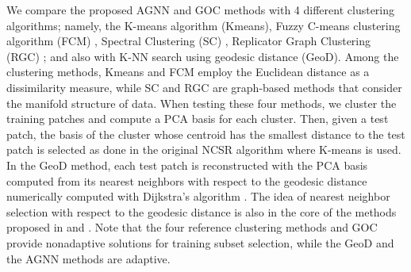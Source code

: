 \documentclass[journal]{IEEEtran}
\begin{document}
We compare the proposed AGNN and GOC methods  with 4 different clustering algorithms; namely,  the K-means algorithm (Kmeans), Fuzzy C-means clustering algorithm (FCM) \cite{Bezdek1984}, Spectral Clustering (SC) \cite{Shi00normalized}, Replicator Graph Clustering (RGC) \cite{Donoser13replicator}; and also with K-NN search using geodesic distance (GeoD). Among the clustering methods,  Kmeans and FCM employ the Euclidean distance as a dissimilarity measure, while SC and RGC are graph-based methods that consider the manifold structure of data. When testing these four methods, we cluster the training patches and compute a PCA basis for each cluster. Then, given a test patch, the basis of the cluster whose centroid has the smallest distance to the test patch is selected as done in the original NCSR algorithm where K-means is used. In the GeoD method, each test patch is reconstructed with the PCA basis computed from its nearest neighbors with respect to the geodesic distance numerically computed with Dijkstra's algorithm \cite{Dijkstra59a}. The idea of nearest neighbor selection with respect to the geodesic distance is also in the core of the methods proposed in \cite{Turaga10nearest} and \cite{Chaudhry10fast}. Note that the four reference clustering methods and GOC provide nonadaptive solutions for training subset selection, while the GeoD and the AGNN methods are adaptive.
\end{document}
